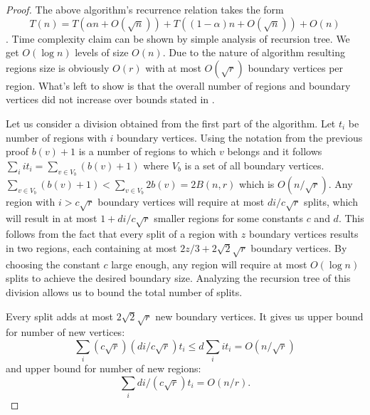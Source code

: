 \begin{proof}
The above algorithm's recurrence relation takes the form  
$$ T(n) = T(\alpha n + O(\sqrt{n})) + T((1-\alpha) n + O(\sqrt{n})) + O(n) $$.
Time complexity claim can be shown by simple analysis of recursion tree. We get $O(\log n)$ levels of size $O(n)$.
Due to the nature of algorithm resulting regions size is obviously $O(r)$ with at most $O(\sqrt{r})$ boundary vertices per region. What's left to show is that the overall number of regions and boundary vertices did not increase over bounds stated in .

Let us consider a division obtained from the first part of the algorithm. Let $t_i$ be number of regions with $i$ boundary vertices. Using the notation from the previous proof $b(v) + 1$ is a number of regions to which $v$ belongs and it follows $\sum_i i t_i = \sum_{v \in V_b} (b(v) + 1)$ where $V_b$ is a set of all boundary vertices. $\sum_{v \in V_b} (b(v) + 1) < \sum_{v \in V_b} 2 b(v) =  2 B(n,r)$ which is $O(n/\sqrt{r})$. Any region with $i > c \sqrt{r}$ boundary vertices will require at most  $d i /  c \sqrt{r}$ splits, which will result in at most $1 + d i /  c \sqrt{r}$ smaller regions for some constants $c$ and $d$.
This follows from the fact that every split of a region with $z$ boundary vertices results in two regions, each containing at most $2z/3 + 2\sqrt{2} \sqrt{r}$ boundary vertices. By choosing the constant $c$ large enough, any region will require at most $O(\log n)$ splits to achieve the desired boundary size. Analyzing the recursion tree of this division allows us to bound the total number of splits.

Every split adds at most $2\sqrt{2} \sqrt{r}$ new boundary vertices. It gives us upper bound for number of new vertices:
$$ \sum_i (c\sqrt{r})(d i /  c \sqrt{r}) t_i \leq d \sum_i i t_i = O(n / \sqrt{r})$$
and upper bound for number of new regions:
$$ \sum_i d i / (c \sqrt{r}) t_i = O(n/r).$$
\end{proof}


